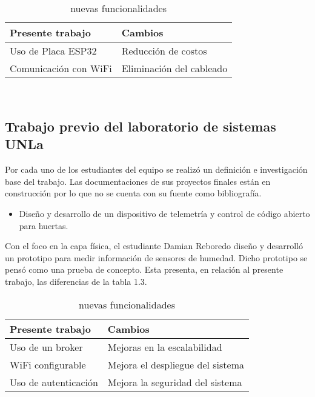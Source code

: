 \begin{table}[h]
	\centering
	\caption[caption corto]{nuevas funcionalidades}
	\begin{tabular}{l l}    
		\toprule
		\textbf{Presente trabajo} & \textbf{Cambios}\\	
		\midrule
		Uso de Placa ESP32           & Reducción de costos	\\		
		Comunicación con WiFi          & Eliminación del cableado\\		
		\bottomrule
		\hline
	\end{tabular}
	\label{tab:peces}\\
\end{table}

\subsection{Trabajo previo del laboratorio de sistemas UNLa}
Por cada uno de los estudiantes del equipo se realizó un definición e investigación base del trabajo. Las documentaciones de sus proyectos finales están en construcción por lo que no se cuenta con su fuente como bibliografía.

\begin{itemize}
\item Diseño y desarrollo de un dispositivo de telemetría y control de código abierto para huertas.
\end{itemize}
Con el foco en la capa física, el estudiante Damian Reboredo diseño y desarrolló un prototipo para medir información de sensores de humedad. Dicho prototipo se pensó como una prueba de concepto. Esta presenta, en relación al presente trabajo, las diferencias de la tabla 1.3.\\

\begin{table}[h]
	\centering
	\caption[caption corto]{nuevas funcionalidades}
	\begin{tabular}{l l}    
		\toprule
		\textbf{Presente trabajo} & \textbf{Cambios}\\	
		\midrule
		Uso de un broker           & Mejoras en la escalabilidad	\\		
		WiFi configurable          & Mejora el despliegue del sistema\\		
		Uso de autenticación          & Mejora la seguridad del sistema\\		
		\bottomrule
		\hline
	\end{tabular}
	\label{tab:peces}
\end{table}

